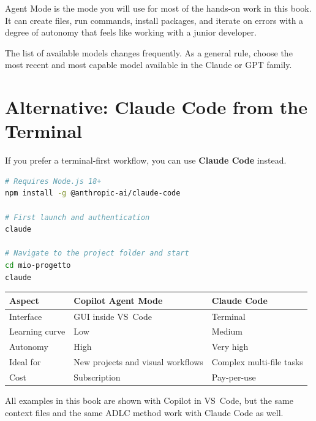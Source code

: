 \begin{warnbox}
Agent Mode is the mode you will use for most of the hands-on work in this book. It can create files, run commands, install packages, and iterate on errors with a degree of autonomy that feels like working with a junior developer.
\end{warnbox}

\begin{versionbox}
The list of available models changes frequently. As a general rule, choose the most recent and most capable model available in the Claude or GPT family.
\end{versionbox}

\section{Alternative: Claude Code from the Terminal}

If you prefer a terminal-first workflow, you can use \textbf{Claude Code} instead.

\begin{praticabox}[title={Hands-on --- Installing Claude Code}]
\begin{lstlisting}[language=bash]
# Requires Node.js 18+
npm install -g @anthropic-ai/claude-code

# First launch and authentication
claude

# Navigate to the project folder and start
cd mio-progetto
claude
\end{lstlisting}
\end{praticabox}

\begin{center}
\begin{tabularx}{\textwidth}{l X X}
\toprule
\textbf{Aspect} & \textbf{Copilot Agent Mode} & \textbf{Claude Code} \\
\midrule
Interface & GUI inside VS~Code & Terminal \\
Learning curve & Low & Medium \\
Autonomy & High & Very high \\
Ideal for & New projects and visual workflows & Complex multi-file tasks \\
Cost & Subscription & Pay-per-use \\
\bottomrule
\end{tabularx}
\end{center}

\begin{tipbox}
All examples in this book are shown with Copilot in VS~Code, but the same context files and the same ADLC method work with Claude Code as well.
\end{tipbox}

